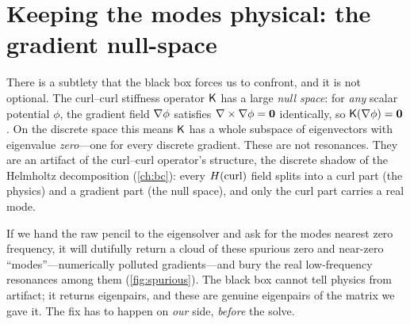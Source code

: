 \section{Keeping the modes physical: the gradient null-space}
\label{sec:eig-spurious}

There is a subtlety that the black box forces us to confront, and it is not
optional. The curl--curl stiffness operator $\mathsf{K}$ has a large \emph{null
space}: for \emph{any} scalar potential $\phi$, the gradient field $\nabla\phi$
satisfies $\nabla\times\nabla\phi=\mathbf 0$ identically, so $\mathsf{K}(\nabla\phi)=\mathbf 0$.
On the discrete space this means $\mathsf{K}$ has a whole subspace of eigenvectors with
eigenvalue \emph{zero}---one for every discrete gradient. These are not
resonances. They are an artifact of the curl--curl operator's structure, the
discrete shadow of the Helmholtz decomposition (\cref{ch:bc}): every $H(\mathrm{curl})$
field splits into a curl part (the physics) and a gradient part (the null space),
and only the curl part carries a real mode.

If we hand the raw pencil to the eigensolver and ask for the modes nearest zero
frequency, it will dutifully return a cloud of these spurious zero and
near-zero ``modes''---numerically polluted gradients---and bury the real
low-frequency resonances among them (\cref{fig:spurious}). The black box cannot
tell physics from artifact; it returns eigenpairs, and these are genuine
eigenpairs of the matrix we gave it. The fix has to happen on \emph{our} side,
\emph{before} the solve.

